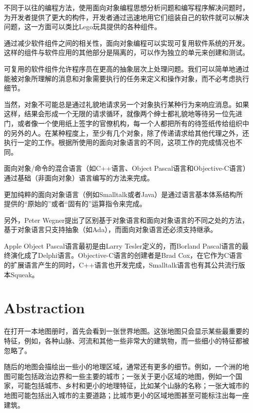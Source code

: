 不同于以往的编程方法，使用面向对象编程思想分析问题和编写程序解决问题时，为开发者提供了更大的构件，开发者通过迅速地用它们组装自己的软件就可以解决问题，这一方面可以类比Lego玩具提供的各种组件。

通过减少软件组件之间的相关性，面向对象编程可以实现可复用软件系统的开发。这样的组件与软件应用的其他部分是隔离的，可以作为独立的单元来创建和测试。


可复用的软件组件允许程序员在更高的抽象层次上处理问题。我们可以简单地通过能被对象所理解的消息和对象需要执行的任务来定义和操作对象，而不必考虑执行细节。

当然，对象不可能总是通过礼貌地请求另一个对象执行某种行为来响应消息。如果这样，结果会形成一个无限的请求循环，就像两个绅士都礼貌地等待另一位先进门，或者像一个使用纸上签字的官僚机构，每一个人都把所有的待签纸传给组织中的另外的人。在某种程度上，至少有几个对象，除了传递请求给其他代理之外，还执行一定的工作。根据所使用的面向对象语言的不同，这项工作的完成情况也不同。

\begin{compactitem}
\item 面向对象/命令的混合语言（如C++语言、Object Pascal语言和Objective-C语言）通过基础（非面向对象）语言编写的方法来完成。

\item 更加纯粹的面向对象语言（例如Smalltalk或者Java）是通过语言基本体系结构所提供的“原始的”或者“固有的”运算指令来完成。

\end{compactitem}

另外，Peter Wegner提出了区别基于对象语言和面向对象语言的不同之处的方法，基于对象语言只支持抽象（如Ada），而面向对象语言还必须支持继承。

Apple Object Pascal语言最初是由Larry Tesler定义的，而Borland Pascal语言的最终演化成了Delphi语言。Objective-C语言的创建者是Brad Cox，在它作为C语言的扩展语言产生的同时，C++语言也开发完成，Smalltalk语言也有其公共流行版本Squeak。

\chapter{Abstraction}

在打开一本地图册时，首先会看到一张世界地图。这张地图只会显示某些最重要的特征，例如，各种山脉、河流和其他一些非常大的建筑物，而一些细小的特征都被忽略了。

随后的地图会描绘出一些小的地理区域，通常还有更多的细节。例如，一个洲的地图可能包括政治边界和一些主要的城市；一张关于更小区域的地图，例如一个国家，可能包括城市、乡村和更小的地理特征，比如某个山脉的名称；一张大城市的地图可能包括出入城市的主要道路；比城市更小的区域地图甚至可能标注出每一座建筑。

